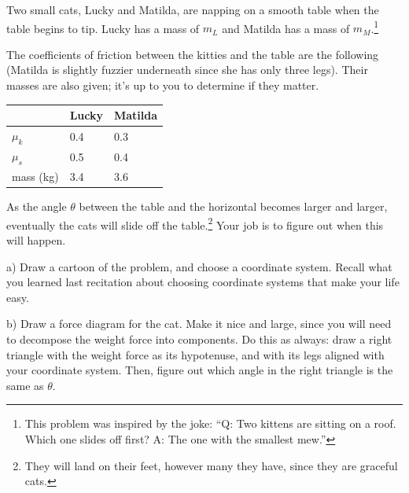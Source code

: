 \documentclass[12pt]{article}
\newcommand{\BS}{\bigskip}
\begin{document}
\newpage


Two small cats, Lucky and Matilda, are napping on a smooth table when the table begins to tip. Lucky has a mass of $m_L$ and Matilda has a mass of $m_M$.\footnote{This problem was inspired by the joke: ``Q: Two kittens are sitting on a roof. Which one slides off first? A: The one with the smallest mew.''}

\begin{minipage}{0.6\textwidth}
The coefficients of friction between the kitties and the table are the following (Matilda is slightly fuzzier underneath since she has only three legs). Their masses are also
given; it's up to you to determine if they matter.
\end{minipage}\hspace{0.1\textwidth}
\begin{minipage}{0.3\textwidth}
\begin{tabular}{|l|l|l|}
\hline
        & Lucky & Matilda \\ \hline
$\mu_k$ & 0.4  & 0.3  \\ \hline
$\mu_s$ & 0.5  & 0.4  \\ \hline
mass (kg) & 3.4 & 3.6 \\ \hline
\end{tabular}
\end{minipage}

As the angle $\theta$ between the table and the horizontal becomes larger and larger, eventually the cats will slide off the 
table.\footnote{They will land on their feet, however many they have, since they are graceful cats.} Your job is to figure out when this will happen.
\BS


a) Draw a cartoon of the problem, and choose a coordinate system. Recall what you learned last recitation about choosing
coordinate systems that make your life easy. 
\vspace{2in}


b) Draw a force diagram for the cat. Make it nice and large, since you will need to decompose the weight force into components. Do this as always: draw a right triangle with the weight force as its 
hypotenuse, and with its legs aligned with your coordinate system. Then, figure out which angle in the right triangle 
is the same as $\theta$. 


\vspace{2in}
\end{document}

